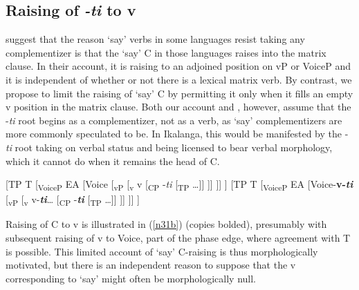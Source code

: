 \documentclass[output=paper,
modfonts
]{langscibook}
\begin{document}
\subsection{Raising of \textit{-ti} to v}\label{sec:letsholo:3.4}

\cite{Diercks2017a} suggest that the reason `say' verbs in some languages resist taking any complementizer is that the `say' C in those languages raises into the matrix clause. In their account, it is raising to an adjoined position on vP or VoiceP and it is independent of whether or not there is a lexical matrix verb. By contrast, we propose to limit the raising of `say' C 
by permitting it only when it fills an empty v position in the matrix clause. Both our account and \citeauthor{Diercks2017a}, however, assume that the -\textit{ti} root begins as a complementizer, not as a verb, as `say' complementizers are more commonly speculated to be. In Ikalanga, this would be manifested by the -\textit{ti} root taking on verbal status and being licensed to bear verbal morphology, which it cannot do when it remains the head of C.\largerpage[-1] 

\ea 
\ea\label{n31a} \textup{[TP T  [\textsubscript{VoiceP} EA [Voice [\textsubscript{vP} [\textsubscript{v} v [\textsubscript{CP} -\textit{ti} [\textsubscript{TP} …]] ]] ]] ]}
\ex\label{n31b}	\textup{[TP T  [\textsubscript{VoiceP} EA [Voice-\textbf{v-\textit{ti}} [\textsubscript{vP} [\textsubscript{v} v-\textbf{\textit{ti}}… [\textsubscript{CP} -\textbf{\textit{ti}} [\textsubscript{TP} …]] ]] ]] ]}
\z \z 

Raising of C to v is illustrated in (\ref{n31b}) (copies bolded), presumably with subsequent raising of v to Voice, part of the phase edge, where agreement with T is possible. This limited account of `say' C-raising is thus morphologically motivated, but there is an independent reason to suppose that the v corresponding to `say' might often be morphologically null.
\end{document}
